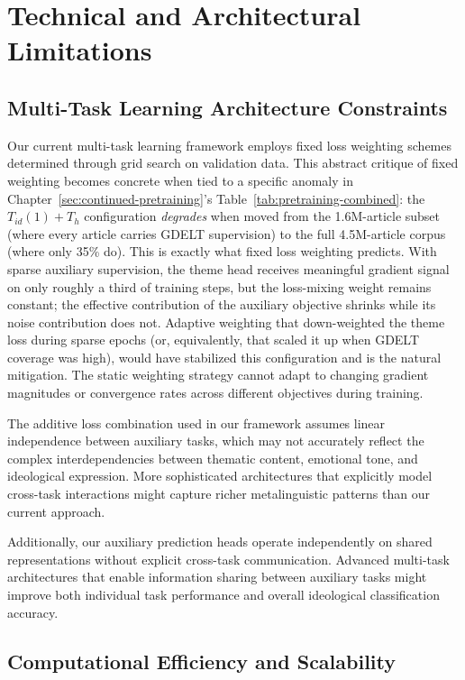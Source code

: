 \section{Technical and Architectural Limitations}
\label{sec:technical-limitations}

\subsection{Multi-Task Learning Architecture Constraints}

Our current multi-task learning framework employs fixed loss weighting schemes determined through grid search on validation data. This abstract critique of fixed weighting becomes concrete when tied to a specific anomaly in Chapter~\ref{sec:continued-pretraining}'s Table~\ref{tab:pretraining-combined}: the $T_{id}(1)+T_h$ configuration \emph{degrades} when moved from the 1.6M-article subset (where every article carries GDELT supervision) to the full 4.5M-article corpus (where only 35\% do). This is exactly what fixed loss weighting predicts. With sparse auxiliary supervision, the theme head receives meaningful gradient signal on only roughly a third of training steps, but the loss-mixing weight remains constant; the effective contribution of the auxiliary objective shrinks while its noise contribution does not. Adaptive weighting that down-weighted the theme loss during sparse epochs (or, equivalently, that scaled it up when GDELT coverage was high), would have stabilized this configuration and is the natural mitigation. The static weighting strategy cannot adapt to changing gradient magnitudes or convergence rates across different objectives during training.

The additive loss combination used in our framework assumes linear independence between auxiliary tasks, which may not accurately reflect the complex interdependencies between thematic content, emotional tone, and ideological expression. More sophisticated architectures that explicitly model cross-task interactions might capture richer metalinguistic patterns than our current approach.

Additionally, our auxiliary prediction heads operate independently on shared representations without explicit cross-task communication. Advanced multi-task architectures that enable information sharing between auxiliary tasks might improve both individual task performance and overall ideological classification accuracy.

\subsection{Computational Efficiency and Scalability}


